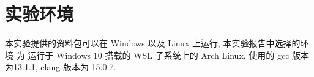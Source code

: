 \section{实验环境}

本实验提供的资料包可以在 Windows 以及 Linux 上运行, 本实验报告中选择的环境
为 运行于 Windows 10 搭载的 WSL 子系统上的 Arch Linux, 使用的 gcc 版本为13.1.1, clang 版本为 15.0.7.